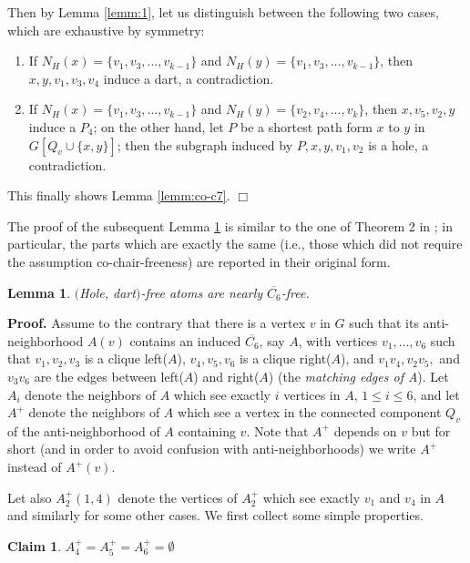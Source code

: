 \documentclass[11pt]{article}
\newcommand{\qed}{\hfill $\Box$}
\newcommand{\0}{\text{ has a co-join to }}
\newcommand{\1}{\text{ has a join to }}
\newtheorem{lemm}{Lemma}
\newtheorem{clai}{Claim}[section]
\begin{document}
Then by Lemma \ref{lemm:1}, let us distinguish between the following two cases, which are exhaustive by symmetry:

\begin{enumerate}
\item If $N_H(x) = \{v_1,v_3,\ldots,v_{k-1}\}$ and $N_H(y) = \{v_1,v_3,\ldots,v_{k-1}\}$, then $x,y,v_1,v_3,v_4$ induce a dart, a contradiction.
\item If $N_H(x) = \{v_1,v_3,\ldots,v_{k-1}\}$ and $N_H(y) = \{v_2,v_4,\ldots,v_{k}\}$, then $x,v_5,v_2,y$ induce a $P_4$; on the other hand, let $P$ be a shortest path form $x$ to $y$ in $G[Q_v \cup \{x,y\}]$; then the subgraph induced by $P,x,y,v_1,v_2$ is a hole, a contradiction.   
\end{enumerate}
This finally shows Lemma \ref{lemm:co-c7}.
\qed

\medskip

The proof of the subsequent Lemma \ref{lemm:co-c6} is similar to the one of Theorem 2 in \cite{BraGia2012}; in particular, the parts which are exactly the same (i.e., those which did not require the assumption co-chair-freeness) are reported in their original form.

\begin{lemm}\label{lemm:co-c6}
$($Hole, dart$)$-free atoms are nearly $\overline{C_6}$-free.
\end{lemm}

\noindent
{\bf Proof.}
Assume to the contrary that there is a vertex $v$ in $G$ such that its anti-neighborhood $A(v)$ contains an induced $\overline{C_6}$, say $A$, with vertices $v_1,\ldots,v_6$ such that $v_1,v_2,v_3$ is a clique left($A$), $v_4,v_5,v_6$ is a clique right($A$), and $v_1v_4, v_2v_5,$ and $v_3v_6$ are the edges between left($A$) and right($A$) (the {\em matching edges of A}). Let $A_i$ denote the neighbors of $A$ which see exactly $i$ vertices in $A$, $1 \leq i \leq 6$, and let $A^+$ denote the neighbors of $A$ which see a vertex in the connected component $Q_v$ of the anti-neighborhood of $A$ containing $v$. Note that $A^+$ depends on $v$ but for short (and in order to avoid confusion with anti-neighborhoods) we write $A^+$ instead of $A^+(v)$.

Let also $A_2^+(1,4)$ denote the vertices of $A_2^+$ which see exactly $v_1$ and $v_4$ in $A$ and similarly for some other cases. We first collect some simple properties.

\begin{clai}\label{clai:3}
$A_4^+ = A_5^+ = A_6^+ = \emptyset$
\end{clai}
\end{document}
